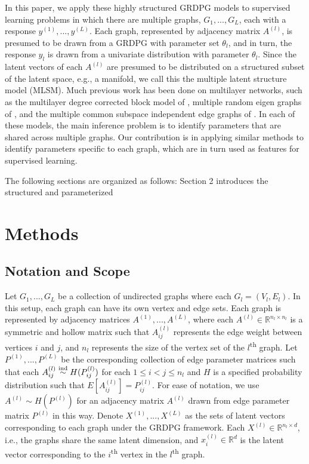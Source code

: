 \documentclass[12pt]{article}
\begin{document}
In this paper, we apply these highly structured GRDPG models to
supervised learning problems in which there are multiple graphs,
\(G_1, ..., G_L\), each with a response \(y^{(1)}, ..., y^{(L)}\). Each
graph, represented by adjacency matrix \(A^{(l)}\), is presumed to be
drawn from a GRDPG with parameter set \(\theta_l\), and in turn, the
response \(y_l\) is drawn from a univariate distribution with parameter
\(\theta_l\). Since the latent vectors of each \(A^{(l)}\) are presumed
to be distributed on a structured subset of the latent space, e.g., a
manifold, we call this the multiple latent structure model (MLSM). Much
previous work has been done on multilayer networks, such as the
multilayer degree corrected block model of \citet{agterberg2022joint},
multiple random eigen graphs of \citet{8889404}, and the multiple common
subspace independent edge graphs of \citet{arroyo2020inference}. In each
of these models, the main inference problem is to identify parameters
that are shared across multiple graphs. Our contribution is in applying
similar methods to identify parameters specific to each graph, which are
in turn used as features for supervised learning.

The following sections are organized as follows: Section 2 introduces
the structured and parameterized

\section{Methods}\label{methods}

\subsection{Notation and Scope}\label{notation-and-scope}

Let \(G_1, ..., G_L\) be a collection of undirected graphs where each
\(G_l = (V_l, E_l)\). In this setup, each graph can have its own vertex
and edge sets. Each graph is represented by adjacency matrices
\(A^{(1)}, ..., A^{(L)}\), where each
\(A^{(l)} \in \mathbb{R}^{n_l \times n_l}\) is a symmetric and hollow
matrix such that \(A^{(l)}_{ij}\) represents the edge weight between
vertices \(i\) and \(j\), and \(n_l\) represents the size of the vertex
set of the \(l\)\textsuperscript{th} graph. Let
\(P^{(1)}, ..., P^{(L)}\) be the corresponding collection of edge
parameter matrices such that each
\(A^{(l)}_{ij} \stackrel{\mathrm{ind}}{\sim} H(P^{(l)}_{ij})\) for each
\(1 \leq i < j \leq n_l\) and \(H\) is a specified probability
distribution such that \(E[A^{(l)}_{ij}] = P^{(l)}_{ij}\). For ease of
notation, we use \(A^{(l)} \sim H(P^{(l)})\) for an adjacency matrix
\(A^{(l)}\) drawn from edge parameter matrix \(P^{(l)}\) in this way.
Denote \(X^{(1)}, ..., X^{(L)}\) as the sets of latent vectors
corresponding to each graph under the GRDPG framework. Each
\(X^{(l)} \in \mathbb{R}^{n_l \times d}\), i.e., the graphs share the
same latent dimension, and \(x_i^{(l)} \in \mathbb{R}^d\) is the latent
vector corresponding to the \(i\)\textsuperscript{th} vertex in the
\(l\)\textsuperscript{th} graph.
\end{document}

